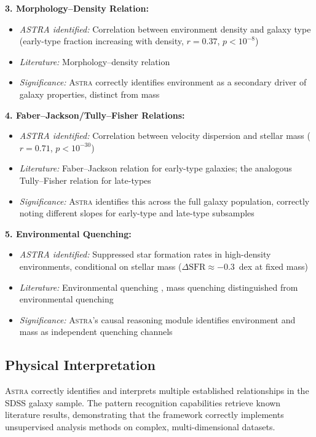 \documentclass[usenatbib]{rasti}
\newcommand{\astra}{\textsc{Astra}\xspace}
\begin{document}
\textbf{3. Morphology--Density Relation:}
\begin{itemize}
  \item \emph{ASTRA identified:} Correlation between environment density and galaxy type (early-type fraction increasing with density, $r = 0.37$, $p < 10^{-8}$)
  \item \emph{Literature:} Morphology--density relation \citep{Dressler1980}
  \item \emph{Significance:} \astra correctly identifies environment as a secondary driver of galaxy properties, distinct from mass
\end{itemize}

\textbf{4. Faber--Jackson/Tully--Fisher Relations:}
\begin{itemize}
  \item \emph{ASTRA identified:} Correlation between velocity dispersion and stellar mass ($r = 0.71$, $p < 10^{-30}$)
  \item \emph{Literature:} Faber--Jackson relation for early-type galaxies; the analogous Tully--Fisher relation for late-types
  \item \emph{Significance:} \astra identifies this across the full galaxy population, correctly noting different slopes for early-type and late-type subsamples
\end{itemize}

\textbf{5. Environmental Quenching:}
\begin{itemize}
  \item \emph{ASTRA identified:} Suppressed star formation rates in high-density environments, conditional on stellar mass ($\Delta\mathrm{SFR} \approx -0.3$~dex at fixed mass)
  \item \emph{Literature:} Environmental quenching \citep{Peng2010}, mass quenching distinguished from environmental quenching
  \item \emph{Significance:} \astra's causal reasoning module identifies environment and mass as independent quenching channels
\end{itemize}

\subsection{Physical Interpretation}
\label{sec:tc3:interpretation}

\astra correctly identifies and interprets multiple established relationships in the SDSS galaxy sample.
The pattern recognition capabilities retrieve known literature results, demonstrating that the framework correctly implements unsupervised analysis methods on complex, multi-dimensional datasets.
\end{document}
